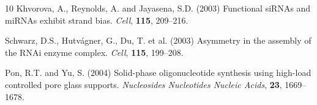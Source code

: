 \documentclass[twocolumn]{article}
\begin{document}
\begin{thebibliography}{10}
Khvorova, A., Reynolds, A. and Jayasena, S.D. (2003) Functional siRNAs and miRNAs exhibit strand bias. \textit{Cell}, \textbf{115}, 209--216.

Schwarz, D.S., Hutvágner, G., Du, T. et al. (2003) Asymmetry in the assembly of the RNAi enzyme complex. \textit{Cell}, \textbf{115}, 199--208.

Pon, R.T. and Yu, S. (2004) Solid-phase oligonucleotide synthesis using high-load controlled pore glass supports. \textit{Nucleosides Nucleotides Nucleic Acids}, \textbf{23}, 1669--1678.

\end{thebibliography}
\end{document}
